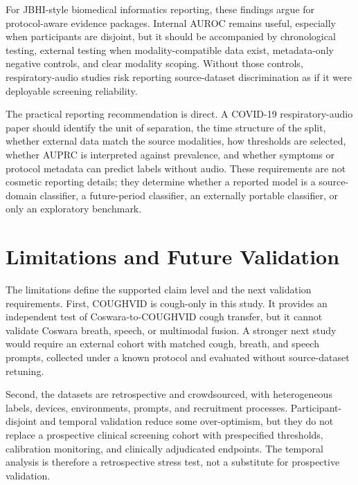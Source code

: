 \documentclass[journal]{IEEEtran}
\begin{document}
For JBHI-style biomedical informatics reporting, these findings argue for protocol-aware evidence packages. Internal AUROC remains useful, especially when participants are disjoint, but it should be accompanied by chronological testing, external testing when modality-compatible data exist, metadata-only negative controls, and clear modality scoping. Without those controls, respiratory-audio studies risk reporting source-dataset discrimination as if it were deployable screening reliability.

The practical reporting recommendation is direct. A COVID-19 respiratory-audio paper should identify the unit of separation, the time structure of the split, whether external data match the source modalities, how thresholds are selected, whether AUPRC is interpreted against prevalence, and whether symptoms or protocol metadata can predict labels without audio. These requirements are not cosmetic reporting details; they determine whether a reported model is a source-domain classifier, a future-period classifier, an externally portable classifier, or only an exploratory benchmark.

\section{Limitations and Future Validation}
The limitations define the supported claim level and the next validation requirements. First, COUGHVID is cough-only in this study. It provides an independent test of Coswara-to-COUGHVID cough transfer, but it cannot validate Coswara breath, speech, or multimodal fusion. A stronger next study would require an external cohort with matched cough, breath, and speech prompts, collected under a known protocol and evaluated without source-dataset retuning.

Second, the datasets are retrospective and crowdsourced, with heterogeneous labels, devices, environments, prompts, and recruitment processes. Participant-disjoint and temporal validation reduce some over-optimism, but they do not replace a prospective clinical screening cohort with prespecified thresholds, calibration monitoring, and clinically adjudicated endpoints. The temporal analysis is therefore a retrospective stress test, not a substitute for prospective validation.
\end{document}

